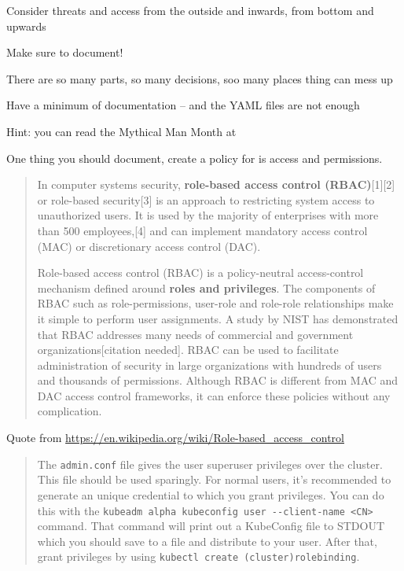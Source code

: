 \documentclass[Screen16to9,17pt]{foils}
\begin{document}
Consider threats and access from the outside and inwards, from bottom and upwards




\begin{list2}
\item Make sure to document!
\item There are so many parts, so many decisions, soo many places thing can mess up
\item Have a minimum of documentation -- and the YAML files are not enough
\item Hint:  you can read the Mythical Man Month at 
\end{list2}



One thing you should document, create a policy for is access and permissions.

\begin{quote}
In computer systems security, {\bf role-based access control (RBAC)}[1][2] or role-based security[3] is an approach to restricting system access to unauthorized users. It is used by the majority of enterprises with more than 500 employees,[4] and can implement mandatory access control (MAC) or discretionary access control (DAC).

Role-based access control (RBAC) is a policy-neutral access-control mechanism defined around {\bf roles and privileges}. The components of RBAC such as role-permissions, user-role and role-role relationships make it simple to perform user assignments. A study by NIST has demonstrated that RBAC addresses many needs of commercial and government organizations[citation needed]. RBAC can be used to facilitate administration of security in large organizations with hundreds of users and thousands of permissions. Although RBAC is different from MAC and DAC access control frameworks, it can enforce these policies without any complication.
\end{quote}
Quote from \url{https://en.wikipedia.org/wiki/Role-based_access_control}



\begin{quote}
The \verb+admin.conf+ file gives the user superuser privileges over the cluster. This file should be used sparingly. For normal users, it's recommended to generate an unique credential to which you grant privileges. You can do this with the \verb+kubeadm alpha kubeconfig user --client-name <CN>+ command. That command will print out a KubeConfig file to STDOUT which you should save to a file and distribute to your user. After that, grant privileges by using \verb+kubectl create (cluster)rolebinding+.
\end{quote}
\end{document}
